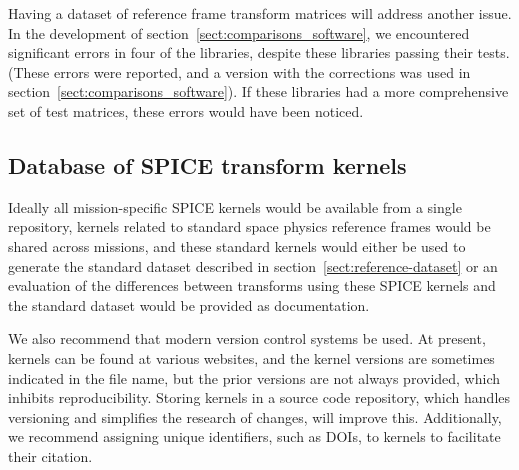 \documentclass[draft]{agujournal2019}
\begin{document}

Having a dataset of reference frame transform matrices will address another issue. In the development of section~\ref{sect:comparisons_software}, we encountered significant errors in four of the libraries, despite these libraries passing their tests. (These errors were reported, and a version with the corrections was used in section~\ref{sect:comparisons_software}). If these libraries had a more comprehensive set of test matrices, these errors would have been noticed.




\subsection{Database of SPICE transform kernels}




Ideally all mission-specific SPICE kernels would be available from a single repository, kernels related to standard space physics reference frames would be shared across missions, and these standard kernels would either be used to generate the standard dataset described in section~\ref{sect:reference-dataset} or an evaluation of the differences between transforms using these SPICE kernels and the standard dataset would be provided as documentation.

We also recommend that modern version control systems be used. At present, kernels can be found at various websites, and the kernel versions are sometimes indicated in the file name, but the prior versions are not always provided, which inhibits reproducibility. Storing kernels in a source code repository, which handles versioning and simplifies the research of changes, will improve this. Additionally, we recommend assigning unique identifiers, such as DOIs, to kernels to facilitate their citation.
\end{document}
